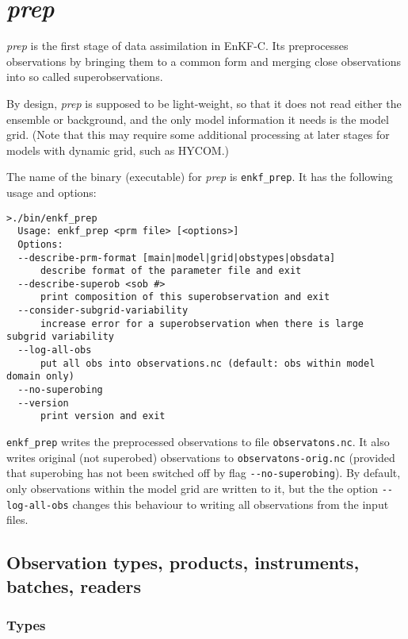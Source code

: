\documentclass[11pt]{report}
\begin{document}
\section{\emph{prep}}

\emph{prep} is the first stage of data assimilation in EnKF-C.
Its preprocesses observations by bringing them to a common form and merging close observations into so called superobservations.

By design, \emph{prep} is supposed to be light-weight, so that it does not read either the ensemble or background, and the only model information it needs is the model grid. 
(Note that this may require some additional processing at later stages for models with dynamic grid, such as HYCOM.)

The name of the binary (executable) for \emph{prep} is \verb|enkf_prep|.
It has the following usage and options:
\begin{Verbatim}[frame=single,fontsize=\footnotesize]
>./bin/enkf_prep
  Usage: enkf_prep <prm file> [<options>]
  Options:
  --describe-prm-format [main|model|grid|obstypes|obsdata]
      describe format of the parameter file and exit
  --describe-superob <sob #>
      print composition of this superobservation and exit
  --consider-subgrid-variability
      increase error for a superobservation when there is large subgrid variability
  --log-all-obs
      put all obs into observations.nc (default: obs within model domain only)
  --no-superobing
  --version
      print version and exit
\end{Verbatim}

\verb|enkf_prep| writes the preprocessed observations to file \verb|observatons.nc|.
It also writes original (not superobed) observations to \verb|observatons-orig.nc| (provided that superobing has not been switched off by flag \verb|--no-superobing|).
By default, only observations within the model grid are written to it, but the the option \verb|--log-all-obs| changes this behaviour to writing all observations from the input files.

\subsection{Observation types, products, instruments, batches, readers}

\subsubsection{Types}
\label{sec:types}
\end{document}
